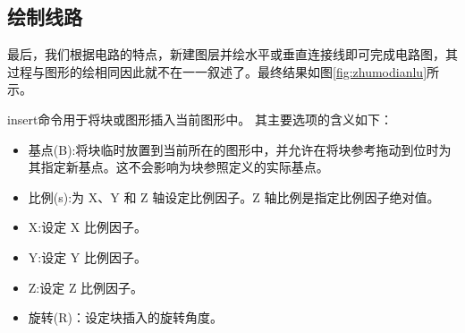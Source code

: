 \subsection{绘制线路}
最后，我们根据电路的特点，新建图层并绘水平或垂直连接线即可完成电路图，其过程与图形的绘相同因此就不在一一叙述了。最终结果如图\ref{fig:zhumodianlu}所示。

insert命令用于将块或图形插入当前图形中。 其主要选项的含义如下：
\begin{itemize}
\item 基点(B):将块临时放置到当前所在的图形中，并允许在将块参考拖动到位时为其指定新基点。这不会影响为块参照定义的实际基点。 
\item 比例(s):为 X、Y 和 Z 轴设定比例因子。Z 轴比例是指定比例因子绝对值。
\item X:设定 X 比例因子。
\item Y:设定 Y 比例因子。
\item Z:设定 Z 比例因子。
\item 旋转(R)：设定块插入的旋转角度。
\end{itemize}

\endinput